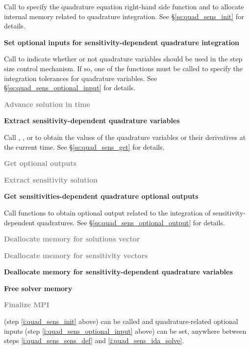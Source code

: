 \begin{Steps}
  Call  to specify the quadrature equation right-hand
  side function and to allocate internal memory related to quadrature integration. 
  See \S\ref{ss:quad_sens_init} for details.

\item\label{i:quad_sens_optional_input}
  {\bf Set optional inputs for sensitivity-dependent quadrature integration}

  Call  to indicate whether or not quadrature variables
  should be used in the step size control mechanism. If so, one of the 
   functions  must be called to specify the integration 
  tolerances for quadrature variables.
  See \S\ref{ss:quad_sens_optional_input} for details.

\item\label{i:quad_sens_ida_solve}
  \textcolor{gray}{\bf Advance solution in time}

\item
  {\bf Extract sensitivity-dependent quadrature variables}

  Call , ,  or 
   to obtain the values of the quadrature variables or their 
  derivatives at the current time. See \S\ref{ss:quad_sens_get} for details.

\item
  \textcolor{gray}{\bf Get optional outputs}

\item
  \textcolor{gray}{\bf Extract sensitivity solution}

\item
  {\bf Get sensitivities-dependent quadrature optional outputs}

  Call  functions to obtain optional output related to
  the integration of sensitivity-dependent quadratures.
  See \S\ref{ss:quad_sens_optional_output} for details.

\item
  \textcolor{gray}{\bf Deallocate memory for solutions vector}

\item 
  \textcolor{gray}{\bf Deallocate memory for sensitivity vectors}

\item
  {\bf Deallocate memory for sensitivity-dependent quadrature variables}
  
\item
  {\bf Free solver memory}

\item 
  \textcolor{gray}{\bf {\p} Finalize MPI}
  
\end{Steps}
 (step \ref{i:quad_sens_init} above) can be called and quadrature-related 
optional inputs (step \ref{i:quad_sens_optional_input} above) can be set, anywhere 
between steps \ref{i:quad_sens_sens_def} and \ref{i:quad_sens_ida_solve}.

